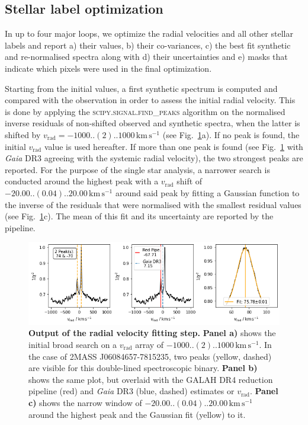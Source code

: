 \documentclass[
  journal=pasa,
  manuscript=research-paper, %
  year=2024,
  volume=37
]{cup-journal}
\newcommand{\vrad}{$v_\mathrm{rad}$\xspace}
\newcommand{\Gaia}{\textit{Gaia}\xspace}
\newcommand{\kms}{\,\mathrm{km\,s^{-1}}}	%
\begin{document}
\subsection{Stellar label optimization}
\label{sec:stellar_label_optimization}

In up to four major loops, we optimize the radial velocities and all other stellar labels and report a) their values, b) their co-variances, c) the best fit synthetic and re-normalised spectra along with d) their uncertainties and e) masks that indicate which pixels were used in the final optimization.

Starting from the initial values, a first synthetic spectrum is computed and compared with the observation in order to assess the initial radial velocity. This is done by applying the \textsc{scipy.signal.find\_peaks} algorithm on the normalised inverse residuals of non-shifted observed and synthetic spectra, when the latter is shifted by $v_\text{rad} = -1000..(2)..1000\kms$ (see Fig.~\ref{fig:181221003101356_single_fit_rv}a). If no peak is found, the initial \vrad value is used hereafter. If more than one peak is found (see Fig.~\ref{fig:181221003101356_single_fit_rv} with \Gaia DR3 agreeing with the systemic radial velocity), the two strongest peaks are reported. For the purpose of the single star analysis, a narrower search is conducted around the highest peak with a \vrad shift of $-20.00..(0.04)..20.00\kms$ around said peak by fitting a Gaussian function to the inverse of the residuals that were normalised with the smallest residual values (see Fig.~\ref{fig:181221003101356_single_fit_rv}c). The mean of this fit and its uncertainty are reported by the pipeline.

\begin{figure}[ht][hbt]
\centering
\includegraphics[width=\textwidth]{figures/181221003101356_single_fit_rv.png}
\caption{\textbf{Output of the radial velocity fitting step.} \textbf{Panel a)} shows the initial broad search on a \vrad array of $-1000..(2)..1000\kms$. In the case of 2MASS J06084657-7815235, two peaks (yellow, dashed) are visible for this double-lined spectroscopic binary. \textbf{Panel b)} shows the same plot, but overlaid with the GALAH DR4 reduction pipeline (red) and \Gaia DR3 (blue, dashed) estimates or \vrad. \textbf{Panel c)} shows the narrow window of $-20.00..(0.04)..20.00\kms$ around the highest peak and the Gaussian fit (yellow) to it.}
\label{fig:181221003101356_single_fit_rv}
\end{figure}
\end{document}
